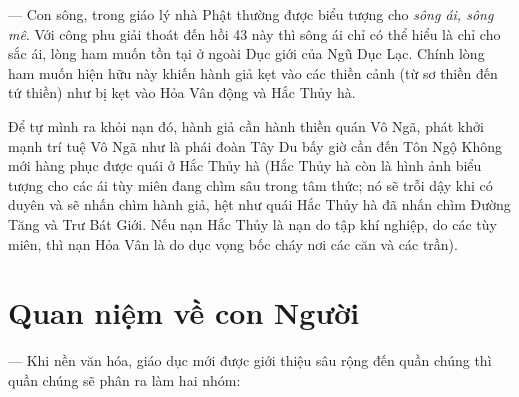 --- Con sông, trong giáo lý nhà Phật thường được biểu tượng cho \emph{sông ái, sông mê}. Với công phu giải thoát đến hồi 43 này thì sông ái chỉ có thể hiểu là chỉ cho sắc ái, lòng ham muốn tồn tại ở ngoài Dục giới của Ngũ Dục Lạc. Chính lòng ham muốn hiện hữu này khiến hành giả kẹt vào các thiền cảnh (từ sơ thiền đến tứ thiền) như bị kẹt vào Hỏa Vân động và Hắc Thủy hà.

Để tự mình ra khỏi nạn đó, hành giả cần hành thiền quán Vô Ngã, phát khởi mạnh trí tuệ Vô Ngã như là phái đoàn Tây Du bấy giờ cần đến Tôn Ngộ Không mới hàng phục được quái ở Hắc Thủy hà (Hắc Thủy hà còn là hình ảnh biểu tượng cho các ái tùy miên đang chìm sâu trong tâm thức; nó sẽ trỗi dậy khi có duyên và sẽ nhấn chìm hành giả, hệt như quái Hắc Thủy hà đã nhấn chìm Đường Tăng và Trư Bát Giới. Nếu nạn Hắc Thủy là nạn do tập khí nghiệp, do các tùy miên, thì nạn Hỏa Vân là do dục vọng bốc cháy nơi các căn và các trần).

\section{Quan niệm về con Người} %
\label{sec:43_con_nguoi}

--- Khi nền văn hóa, giáo dục mới được giới thiệu sâu rộng đến quần chúng thì quần chúng sẽ phân ra làm hai nhóm:

